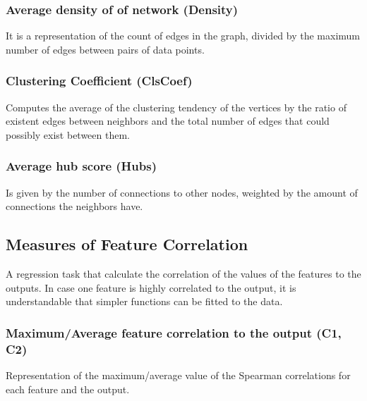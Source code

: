 \subsubsection{Average density of of network (Density)}

It is a representation of the count of edges in the graph, divided by the 
maximum number of edges between pairs of data points.

\subsubsection{Clustering Coefficient (ClsCoef)}

Computes the average of the clustering tendency of the vertices by the ratio
of existent edges between neighbors and the total number of edges that could
possibly exist between them.

\subsubsection{Average hub score (Hubs)}

Is given by the number of connections to other nodes, weighted by the amount
of connections the neighbors have.

\subsection{Measures of Feature Correlation}\label{sec:correlation}

A regression task that calculate the correlation of the values of the features
to the outputs. In case one feature is highly correlated to the output, it is
understandable that simpler functions can be fitted to the data.

\subsubsection{Maximum/Average feature correlation to the output (C1, C2)}

Representation of the maximum/average value of the Spearman correlations for 
each feature and the output.

